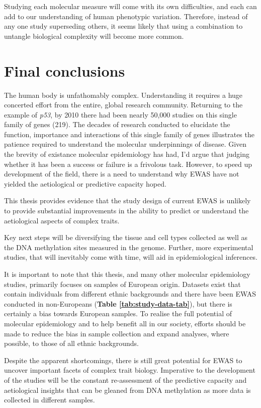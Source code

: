 \documentclass[11pt,oneside]{bristolthesis}
\begin{document}
Studying each molecular measure will come with its own difficulties, and each can add to our understanding of human phenotypic variation. Therefore, instead of any one study superseding others, it seems likely that using a combination to untangle biological complexity will become more common.

\hypertarget{final-conclusions}{%
\section{Final conclusions}\label{final-conclusions}}

The human body is unfathomably complex. Understanding it requires a huge concerted effort from the entire, global research community. Returning to the example of \emph{p53}, by 2010 there had been nearly 50,000 studies on this single family of genes (219). The decades of research conducted to elucidate the function, importance and interactions of this single family of genes illustrates the patience required to understand the molecular underpinnings of disease. Given the brevity of existance molecular epidemiology has had, I'd argue that judging whether it has been a success or failure is a frivolous task. However, to speed up development of the field, there is a need to understand why EWAS have not yielded the aetiological or predictive capacity hoped.

This thesis provides evidence that the study design of current EWAS is unlikely to provide substantial improvements in the ability to predict or understand the aetiological aspects of complex traits.

Key next steps will be diversifying the tissue and cell types collected as well as the DNA methylation sites measured in the genome. Further, more experimental studies, that will inevitably come with time, will aid in epidemiological inferences.

It is important to note that this thesis, and many other molecular epidemiology studies, primarily focuses on samples of European origin. Datasets exist that contain individuals from different ethnic backgrounds and there have been EWAS conducted in non-Europeans (\textbf{Table \ref{tab:study-data-tab}}), but there is certainly a bias towards European samples. To realise the full potential of molecular epidemiology and to help benefit all in our society, efforts should be made to reduce the bias in sample collection and expand analyses, where possible, to those of all ethnic backgrounds.

Despite the apparent shortcomings, there is still great potential for EWAS to uncover important facets of complex trait biology. Imperative to the development of the studies will be the constant re-assessment of the predictive capacity and aetiological insights that can be gleaned from DNA methylation as more data is collected in different samples.
\end{document}

